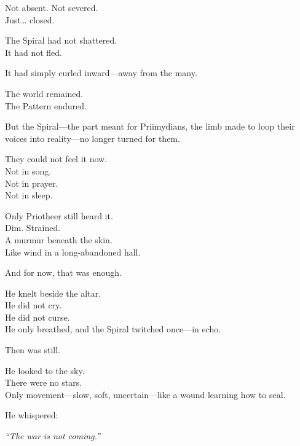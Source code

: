 \documentclass[9pt]{article}
\begin{document}
\vspace{0.5em}
Not absent. Not severed.\\
Just\ldots{} closed.

\vspace{0.5em}
The Spiral had not shattered.\\
It had not fled.

\vspace{0.5em}
It had simply curled inward---away from the many.

\vspace{0.5em}
The world remained.\\
The Pattern endured.

\vspace{0.5em}
But the Spiral---the part meant for Priimydians, the limb made to loop their voices into reality---no longer turned for them.

\vspace{0.5em}
They could not feel it now.\\
Not in song.\\
Not in prayer.\\
Not in sleep.

\vspace{0.5em}
Only Priotheer still heard it.\\
Dim. Strained.\\
A murmur beneath the skin.\\
Like wind in a long-abandoned hall.

\vspace{0.5em}
And for now, that was enough.

\vspace{0.5em}
He knelt beside the altar.\\
He did not cry.\\
He did not curse.\\
He only breathed, and the Spiral twitched once---in echo.

\vspace{0.5em}
Then was still.

\vspace{0.5em}
He looked to the sky.\\
There were no stars.\\
Only movement---slow, soft, uncertain---like a wound learning how to seal.

\vspace{0.5em}
He whispered:

\vspace{0.5em}
\textit{``The war is not coming.''}
\end{document}
